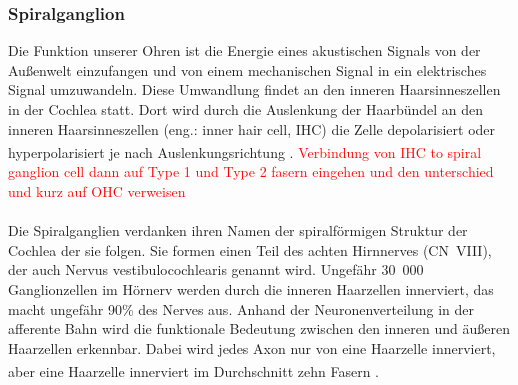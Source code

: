 \documentclass[12pt,a4paper,pdftex]{article}
\begin{document}
\subsubsection*{Spiralganglion}
Die Funktion unserer Ohren ist die Energie eines akustischen Signals von der Außenwelt einzufangen und von einem mechanischen Signal in ein elektrisches Signal umzuwandeln. Diese Umwandlung findet an den inneren Haarsinneszellen in der Cochlea statt. Dort wird durch die Auslenkung der Haarbündel an den inneren Haarsinneszellen (eng.: inner hair cell, IHC) die Zelle depolarisiert oder hyperpolarisiert je nach Auslenkungsrichtung \textsuperscript{\cite[30]{kandel2013principles}}. 
\textcolor{red}{Verbindung von IHC to spiral ganglion cell
dann auf Type 1 und Type 2 fasern eingehen und den unterschied und kurz auf OHC verweisen}
\\
\\
Die Spiralganglien verdanken ihren Namen der spiralförmigen Struktur der Cochlea der sie folgen. Sie formen einen Teil des achten Hirnnerves (CN~VIII), der auch Nervus vestibulocochlearis genannt wird. Ungefähr 30~000 Ganglionzellen im Hörnerv werden durch die inneren Haarzellen innerviert, das macht ungefähr 90\% des Nerves aus. Anhand der Neuronenverteilung in der afferente Bahn wird die funktionale Bedeutung zwischen den inneren und äußeren Haarzellen erkennbar. Dabei wird jedes Axon nur von eine Haarzelle innerviert, aber eine Haarzelle innerviert im Durchschnitt zehn Fasern \textsuperscript{\cite[30]{kandel2013principles}}. 
\end{document}
